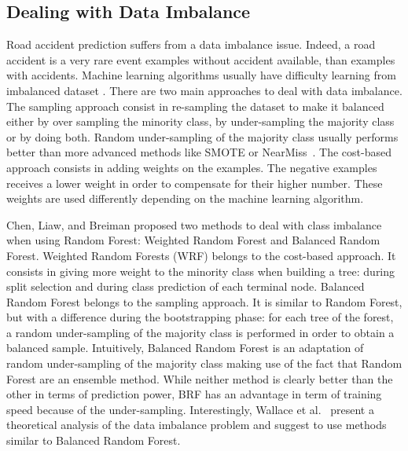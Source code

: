 \documentclass[conference]{IEEEtran}
\newcommand{\english}[1]{\uwave{#1}}  %
\begin{document}

\subsection{Dealing with Data Imbalance}

Road accident prediction suffers from a data imbalance issue. Indeed, a road
accident is a very rare event \english{so we have many more} examples without accident
available, than examples with accidents. Machine learning algorithms usually
have difficulty learning from imbalanced dataset \cite{Branco2016}.
There are two main approaches to deal with data imbalance. The sampling approach
consist in re-sampling the dataset to make it balanced either by over sampling the
minority class, by under-sampling the majority class or by doing both.
Random under-sampling of the majority class usually performs better than
more advanced methods like SMOTE or NearMiss~\cite{Branco2016}.
The cost-based approach consists in adding weights on the examples. The
negative examples receives a lower weight in order to compensate for their
higher number. These weights are used differently depending on the machine
learning algorithm. 

Chen, Liaw, and Breiman\cite{Chen2004} proposed two methods to deal with class imbalance
when using Random Forest: Weighted Random Forest and Balanced Random Forest.
Weighted Random
Forests (WRF) belongs to the cost-based approach. It consists in giving more weight to the minority class when building a tree: during split selection and during 
class prediction of each terminal node. Balanced Random Forest belongs to the sampling
approach. It is similar to Random Forest, but with a
difference during the bootstrapping phase: for each tree of the forest, a random under-sampling of the
majority class is performed in order to obtain a balanced sample. Intuitively,
Balanced Random Forest is an adaptation of random under-sampling of the majority
class making use of the fact that Random Forest are an ensemble method.
While neither method is clearly better than the other in terms of prediction
power, BRF has an advantage in term of training speed because of the under-sampling. Interestingly, Wallace et al.~\cite{Wallace2011} present a theoretical analysis of the data
imbalance problem and suggest to use methods similar to Balanced Random Forest.

\end{document}
